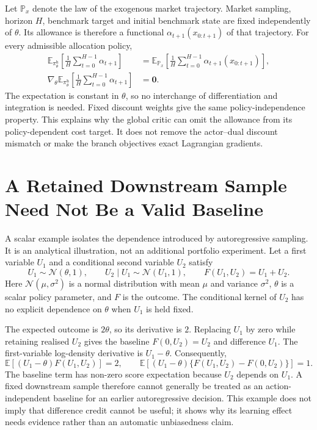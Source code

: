 \documentclass[10pt]{article}
\begin{document}
Let $\mathbb P_x$ denote the law of the exogenous market trajectory. Market sampling, horizon $H$, benchmark target and initial benchmark state are fixed independently of $\theta$. Its allowance is therefore a functional $\alpha_{t+1}(x_{0:t+1})$ of that trajectory. For every admissible allocation policy,
\begin{equation}
  \begin{aligned}
    \mathbb E_{\pi_\theta^{\mathrm h}}\!\left[
      \frac1H\sum_{t=0}^{H-1}\alpha_{t+1}\right]
      &=\mathbb E_{\mathbb P_x}\!\left[
        \frac1H\sum_{t=0}^{H-1}\alpha_{t+1}(x_{0:t+1})\right],\\
    \nabla_\theta\mathbb E_{\pi_\theta^{\mathrm h}}\!\left[
      \frac1H\sum_{t=0}^{H-1}\alpha_{t+1}\right]&=\bm0.
  \end{aligned}
  \label{eq:allowance-independence}
\end{equation}
The expectation is constant in $\theta$, so no interchange of differentiation and integration is needed. Fixed discount weights give the same policy-independence property. This explains why the global critic can omit the allowance from its policy-dependent cost target. It does not remove the actor--dual discount mismatch or make the branch objectives exact Lagrangian gradients.

\section{A Retained Downstream Sample Need Not Be a Valid Baseline}
\label{app:baseline}

A scalar example isolates the dependence introduced by autoregressive sampling. It is an analytical illustration, not an additional portfolio experiment. Let a first variable $U_1$ and a conditional second variable $U_2$ satisfy
\begin{equation}
  U_1\sim\mathcal N(\theta,1),\qquad
  U_2\mid U_1\sim\mathcal N(U_1,1),\qquad
  F(U_1,U_2)=U_1+U_2.
  \label{eq:baseline-example}
\end{equation}
Here $\mathcal N(\mu,\sigma^2)$ is a normal distribution with mean $\mu$ and variance $\sigma^2$, $\theta$ is a scalar policy parameter, and $F$ is the outcome. The conditional kernel of $U_2$ has no explicit dependence on $\theta$ when $U_1$ is held fixed.

The expected outcome is $2\theta$, so its derivative is $2$. Replacing $U_1$ by zero while retaining realised $U_2$ gives the baseline $F(0,U_2)=U_2$ and difference $U_1$. The first-variable log-density derivative is $U_1-\theta$. Consequently,
\begin{equation}
  \mathbb E[(U_1-\theta)F(U_1,U_2)]=2,\qquad
  \mathbb E[(U_1-\theta)\{F(U_1,U_2)-F(0,U_2)\}]=1.
  \label{eq:baseline-counterexample}
\end{equation}
The baseline term has non-zero score expectation because $U_2$ depends on $U_1$. A fixed downstream sample therefore cannot generally be treated as an action-independent baseline for an earlier autoregressive decision. This example does not imply that difference credit cannot be useful; it shows why its learning effect needs evidence rather than an automatic unbiasedness claim.
\end{document}
